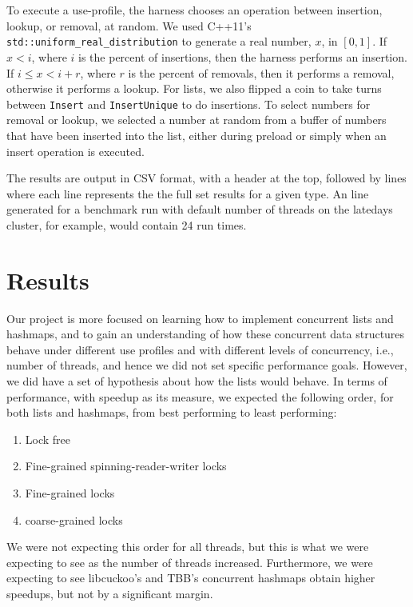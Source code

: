 \documentclass[11pt]{article}
\begin{document}
To execute a use-profile, the harness chooses an operation between insertion,
lookup, or removal, at random. We used C++11's {\tt
std::uniform\_real\_distribution} to generate a real number, $x$, in $[0,1]$. If
$x < i$, where $i$ is the percent of insertions, then the harness performs an
insertion. If $i \le x < i + r$, where $r$ is the percent of removals, then it
performs a removal, otherwise it performs a lookup. For lists, we also flipped a
coin to take turns between {\tt Insert} and {\tt InsertUnique} to do insertions.
To select numbers for removal or lookup, we selected a number at random from a
buffer of numbers that have been inserted into the list, either during preload
or simply when an insert operation is executed.

The results are output in CSV format, with a header at the top, followed by
lines where each line represents the the full set results for a given type. An
line generated for a benchmark run with default number of threads on the
latedays cluster, for example, would contain 24 run times.

\section{Results}
Our project is more focused on learning how to implement concurrent lists and
hashmaps, and to gain an understanding of how these concurrent data structures
behave under different use profiles and with different levels of concurrency,
i.e., number of threads, and hence we did not set specific performance goals.
However, we did have a set of hypothesis about how the lists would behave. In
terms of performance, with speedup as its measure, we expected the following
order, for both lists and hashmaps, from best performing to least performing:

\begin{enumerate}
\item Lock free
\item Fine-grained spinning-reader-writer locks
\item Fine-grained locks
\item coarse-grained locks
\end{enumerate}

We were not expecting this order for all threads, but this is what we were
expecting to see as the number of threads increased. Furthermore, we were
expecting to see libcuckoo's and TBB's concurrent hashmaps obtain higher
speedups, but not by a significant margin.
\end{document}
